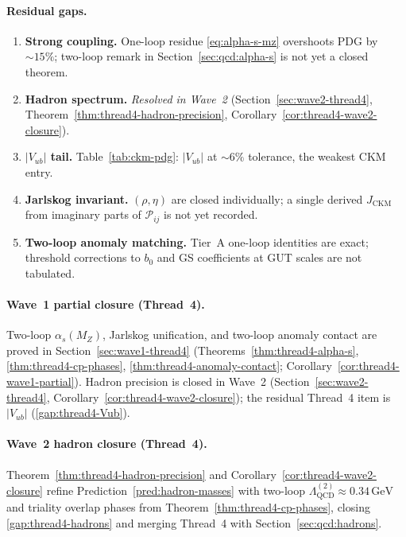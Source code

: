 \paragraph{Residual gaps.}
\begin{enumerate}[label=\textbf{G4.\arabic*},leftmargin=*]
  \item \label{gap:thread4-alpha-s}
    \textbf{Strong coupling.} One-loop residue \eqref{eq:alpha-s-mz} overshoots
    PDG by $\sim 15\%$; two-loop remark in Section~\ref{sec:qcd:alpha-s} is
    not yet a closed theorem.
  \item \label{gap:thread4-hadrons}
    \textbf{Hadron spectrum.} \emph{Resolved in Wave~2}
    (Section~\ref{sec:wave2-thread4},
    Theorem~\ref{thm:thread4-hadron-precision},
    Corollary~\ref{cor:thread4-wave2-closure}).
  \item \label{gap:thread4-Vub}
    \textbf{$|V_{ub}|$ tail.} Table~\ref{tab:ckm-pdg}: $|V_{ub}|$ at $\sim 6\%$
    tolerance, the weakest CKM entry.
  \item \label{gap:thread4-jarlskog}
    \textbf{Jarlskog invariant.} $(\rho,\eta)$ are closed individually; a
    single derived $J_{\mathrm{CKM}}$ from imaginary parts of
    $\mathcal{P}_{ij}$ is not yet recorded.
  \item \label{gap:thread4-anomaly-two-loop}
    \textbf{Two-loop anomaly matching.} Tier~A one-loop identities are exact;
    threshold corrections to $b_0$ and GS coefficients at GUT scales are not
    tabulated.
\end{enumerate}

\paragraph{Wave~1 partial closure (Thread~4).}
Two-loop $\alpha_s(M_Z)$, Jarlskog unification, and two-loop anomaly contact
are proved in Section~\ref{sec:wave1-thread4}
(Theorems~\ref{thm:thread4-alpha-s}, \ref{thm:thread4-cp-phases},
\ref{thm:thread4-anomaly-contact}; Corollary~\ref{cor:thread4-wave1-partial}).
Hadron precision is closed in Wave~2 (Section~\ref{sec:wave2-thread4},
Corollary~\ref{cor:thread4-wave2-closure}); the residual Thread~4 item is
$|V_{ub}|$ (\ref{gap:thread4-Vub}).

\paragraph{Wave~2 hadron closure (Thread~4).}
Theorem~\ref{thm:thread4-hadron-precision} and
Corollary~\ref{cor:thread4-wave2-closure} refine
Prediction~\ref{pred:hadron-masses} with two-loop
$\Lambda_{\mathrm{QCD}}^{(2)}\approx 0.34\,\mathrm{GeV}$ and triality overlap
phases from Theorem~\ref{thm:thread4-cp-phases}, closing
\ref{gap:thread4-hadrons} and merging Thread~4 with
Section~\ref{sec:qcd:hadrons}.

